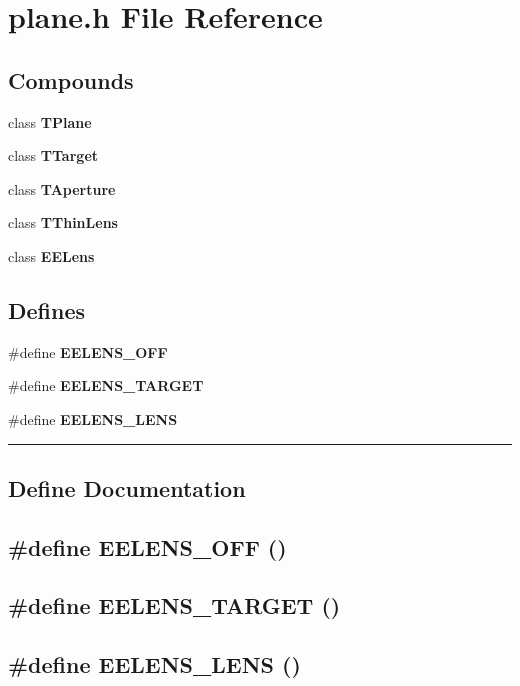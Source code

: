\section{plane.h File Reference}
\label{plane.h}


\subsection*{Compounds}
\begin{CompactItemize}
\item 
class {\bf TPlane}
\item 
class {\bf TTarget}
\item 
class {\bf TAperture}
\item 
class {\bf TThin\-Lens}
\item 
class {\bf EELens}
\end{CompactItemize}
\subsection*{Defines}
\begin{CompactItemize}
\item 
\#define {\bf EELENS\_\-OFF}
\item 
\#define {\bf EELENS\_\-TARGET}
\item 
\#define {\bf EELENS\_\-LENS}
\end{CompactItemize}
\vspace{0.4cm}\hrule\vspace{0.2cm}
\subsection*{Define Documentation}
\label{plane.h_a0}
\subsection{\setlength{\rightskip}{0pt plus 5cm}\#define EELENS\_\-OFF ()}

\label{plane.h_a1}
\subsection{\setlength{\rightskip}{0pt plus 5cm}\#define EELENS\_\-TARGET ()}

\label{plane.h_a2}
\subsection{\setlength{\rightskip}{0pt plus 5cm}\#define EELENS\_\-LENS ()}

